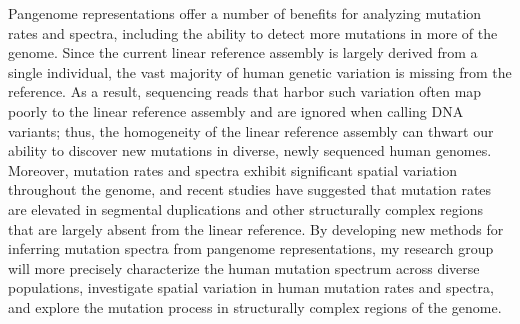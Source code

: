 \documentclass[11pt,a4paper,sans]{moderncv}
\begin{document}
Pangenome representations offer a number of benefits for analyzing mutation rates 
and spectra, including the ability to detect more mutations in more of the genome. 
Since the current linear reference assembly is largely derived from a single 
individual, the vast majority of human genetic variation is missing from the 
reference. As a result, sequencing reads that harbor such variation often map 
poorly to the linear reference assembly and are ignored when calling DNA variants;
thus, the homogeneity of the linear reference assembly can thwart our ability 
to discover new mutations in diverse, newly sequenced human genomes. Moreover, 
mutation rates and spectra exhibit significant spatial variation throughout the 
genome, and recent studies have suggested that mutation rates are elevated in 
segmental duplications and other structurally complex regions that are largely 
absent from the linear reference. By developing new methods for inferring mutation
spectra from pangenome representations, my research group will more precisely 
characterize the human mutation spectrum across diverse populations, investigate
spatial variation in human mutation rates and spectra, and explore the mutation
process in structurally complex regions of the genome.
\end{document}
